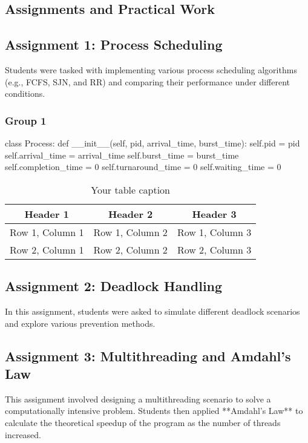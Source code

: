 \documentclass[12pt]{article}
\begin{document}
\begin{enumerate}
\section{Assignments and Practical Work}
\subsection{Assignment 1: Process Scheduling}
Students were tasked with implementing various process scheduling algorithms (e.g., FCFS, SJN, and RR) and comparing their performance under different conditions.
\subsubsection{Group 1}
\begin{python}
    class Process:
    def __init__(self, pid, arrival_time, burst_time):
        self.pid = pid
        self.arrival_time = arrival_time
        self.burst_time = burst_time
        self.completion_time = 0
        self.turnaround_time = 0
        self.waiting_time = 0
\end{python}

\begin{table}[htbp] %
    \centering
    \begin{tabular}{|c|c|c|} %
    \hline
    Header 1 & Header 2 & Header 3 \\ %
    \hline
    Row 1, Column 1 & Row 1, Column 2 & Row 1, Column 3 \\ %
    \hline
    Row 2, Column 1 & Row 2, Column 2 & Row 2, Column 3 \\ %
    \hline
    \end{tabular}
    \caption{Your table caption} %
    \label{tab:your_label} %
\end{table}
\subsection{Assignment 2: Deadlock Handling}
In this assignment, students were asked to simulate different deadlock scenarios and explore various prevention methods.

\subsection{Assignment 3: Multithreading and Amdahl's Law}
This assignment involved designing a multithreading scenario to solve a computationally intensive problem. Students then applied **Amdahl's Law** to calculate the theoretical speedup of the program as the number of threads increased.


\end{enumerate}
\end{document}
